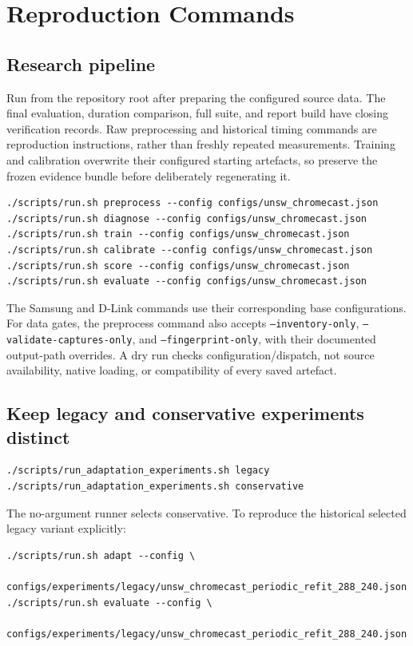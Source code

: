 \section{Reproduction Commands}

\subsection{Research pipeline}

Run from the repository root after preparing the configured source data.
The final evaluation, duration comparison, full suite, and report build have
closing verification records. Raw preprocessing and historical timing commands
are reproduction instructions, rather than freshly repeated measurements. Training and calibration overwrite their
configured starting artefacts, so preserve the frozen evidence bundle before
deliberately regenerating it.

\begin{verbatim}
./scripts/run.sh preprocess --config configs/unsw_chromecast.json
./scripts/run.sh diagnose --config configs/unsw_chromecast.json
./scripts/run.sh train --config configs/unsw_chromecast.json
./scripts/run.sh calibrate --config configs/unsw_chromecast.json
./scripts/run.sh score --config configs/unsw_chromecast.json
./scripts/run.sh evaluate --config configs/unsw_chromecast.json
\end{verbatim}

The Samsung and D-Link commands use their corresponding base configurations.
For data gates, the preprocess command also accepts
\texttt{--inventory-only}, \texttt{--validate-captures-only}, and
\texttt{--fingerprint-only}, with their documented output-path overrides.
A dry run checks configuration/dispatch, not source availability, native
loading, or compatibility of every saved artefact.

\subsection{Keep legacy and conservative experiments distinct}

\begin{verbatim}
./scripts/run_adaptation_experiments.sh legacy
./scripts/run_adaptation_experiments.sh conservative
\end{verbatim}

The no-argument runner selects conservative. To reproduce the historical
selected legacy variant explicitly:

\begin{verbatim}
./scripts/run.sh adapt --config \
  configs/experiments/legacy/unsw_chromecast_periodic_refit_288_240.json
./scripts/run.sh evaluate --config \
  configs/experiments/legacy/unsw_chromecast_periodic_refit_288_240.json
\end{verbatim}

